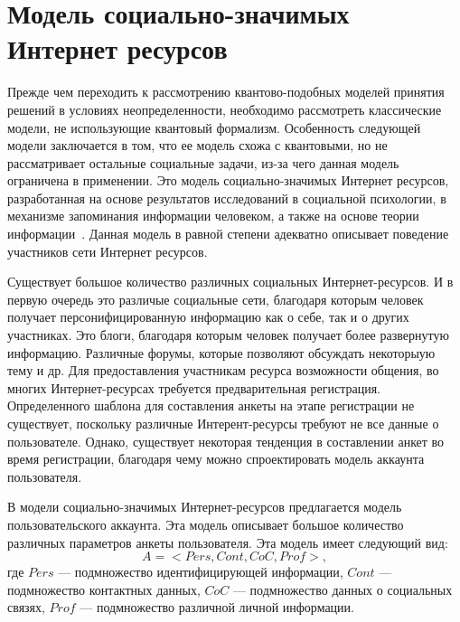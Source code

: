 \section{Модель социально-значимых Интернет ресурсов}

Прежде чем переходить к рассмотрению квантово-подобных моделей принятия решений в условиях неопределенности,
необходимо рассмотреть классические модели, не использующие квантовый формализм. Особенность следующей модели
заключается в том, что ее модель схожа с квантовыми, но не рассматривает остальные социальные задачи, из-за чего
данная модель ограничена в применении.
Это модель социально-значимых Интернет ресурсов, разработанная на основе результатов исследований в социальной
психологии, в механизме запоминания информации человеком, а также на основе теории информации~\citep{pilkevich2015model}.
Данная модель в равной степени адекватно описывает поведение участников сети Интернет ресурсов.

Существует большое количество различных социальных Интернет-ресурсов.
И в первую очередь это различые социальные сети, благодаря которым человек получает персонифицированную информацию
как о себе, так и о других участниках.
Это блоги, благодаря которым человек получает более развернутую информацию.
Различные форумы, которые позволяют обсуждать некоторыую тему и др.
Для предоставления участникам ресурса возможности общения, во многих Интернет-ресурсах требуется предварительная
регистрация.
Определенного шаблона для составления анкеты на этапе регистрации не существует, поскольку различные Интерент-ресурсы
требуют не все данные о пользователе.
Однако, существует некоторая тенденция в составлении анкет во время регистрации, благодаря чему можно спроектировать
модель аккаунта пользователя.

В модели социально-значимых Интернет-ресурсов предлагается модель пользовательского аккаунта.
Эта модель описывает большое количество различных параметров анкеты пользователя.
Эта модель имеет следующий вид:
\begin{equation}
    A = <Pers, Cont, CoC, Prof>,
\end{equation}
где $Pers$ — подмножество идентифицирующей информации, $Cont$ — подмножество контактных данных,
$CoC$ — подмножество данных о социальных связях, $Prof$ — подмножество различной личной информации.

